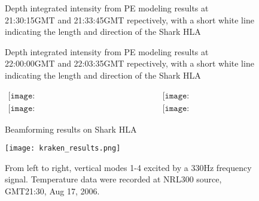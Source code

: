 
\begin{figure}[!ht]
    \caption{Depth integrated intensity from PE modeling results at 21:30:15GMT and 21:33:45GMT repectively, with a short white line indicating the length and direction of the Shark HLA}
    \label{fig:BE_pe_f3}
\end{figure}


\begin{figure}[!ht]
    \caption{Depth integrated intensity from PE modeling results at 22:00:00GMT and 22:03:35GMT repectively, with a short white line indicating the length and direction of the Shark HLA}
    \label{fig:BE_pe_f4}
\end{figure}


\begin{figure}[!ht]
\begin{center}$
\begin{array}{rl}
\texttt{[image: sw06\_nrl300\_beamform\_F3\_ping019.png]}&
\texttt{[image: sw06\_nrl300\_beamform\_F3\_ping031.png]}\\
\texttt{[image: sw06\_nrl300\_beamform\_F4\_ping010.png]}&
\texttt{[image: sw06\_nrl300\_beamform\_F4\_ping041.png]}
\end{array}$       
    \end{center}        
    \caption{Beamforming results on Shark HLA}
    \label{fig:BE_data}
\end{figure}

\begin{figure}[H]
  \centering
  \texttt{[image: kraken\_results.png]}
  \caption{From left to right, vertical modes 1-4 excited by a 330Hz frequency signal. Temperature data were recorded at NRL300 source, GMT21:30, Aug 17, 2006.}\label{fig:a2130}
\end{figure}


